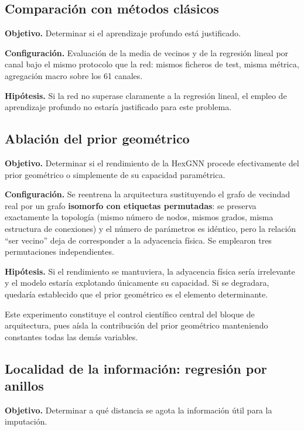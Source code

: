\subsection{Comparación con métodos clásicos}
\label{subsec:exp-baselines}

\textbf{Objetivo.} Determinar si el aprendizaje profundo está justificado.

\textbf{Configuración.} Evaluación de la media de vecinos y de la regresión lineal por canal bajo el
mismo protocolo que la red: mismos ficheros de test, misma métrica, agregación macro sobre los 61
canales.

\textbf{Hipótesis.} Si la red no superase claramente a la regresión lineal, el empleo de
aprendizaje profundo no estaría justificado para este problema.

\subsection{Ablación del prior geométrico}
\label{subsec:exp-ablacion}

\textbf{Objetivo.} Determinar si el rendimiento de la HexGNN procede efectivamente del prior
geométrico o simplemente de su capacidad paramétrica.

\textbf{Configuración.} Se reentrena la arquitectura sustituyendo el grafo de vecindad real por un
grafo \textbf{isomorfo con etiquetas permutadas}: se preserva exactamente la topología (mismo número
de nodos, mismos grados, misma estructura de conexiones) y el número de parámetros es idéntico, pero
la relación ``ser vecino'' deja de corresponder a la adyacencia física. Se emplearon tres
permutaciones independientes.

\textbf{Hipótesis.} Si el rendimiento se mantuviera, la adyacencia física sería irrelevante y el
modelo estaría explotando únicamente su capacidad. Si se degradara, quedaría establecido que el
prior geométrico es el elemento determinante.

Este experimento constituye el control científico central del bloque de arquitectura, pues aísla la
contribución del prior geométrico manteniendo constantes todas las demás variables.

\subsection{Localidad de la información: regresión por anillos}
\label{subsec:exp-anillos}

\textbf{Objetivo.} Determinar a qué distancia se agota la información útil para la imputación.

